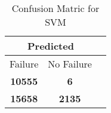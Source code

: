 \begin{table}[] 
\caption{Confusion Matric for SVM} 
\label{Table: Prediction Accuracy-NoneSVM95.0EKF-ignoresolarPanelDipole-solarPanelDipole} 
\centering 
\begin{tabular} 
 {@{}ccc@{}} 
\toprule 
\multicolumn{2}{c}{\textbf{Predicted}}
 \\ \midrule 
\multicolumn{1}{|c|}{Failure} & 
\multicolumn{1}{c|}{No Failure}
 \\ \midrule 
\multicolumn{1}{|c|}{\color{red}\textbf{10555}} & 
\multicolumn{1}{c|}{\color{red}\textbf{6}}
 \\ \midrule 
\multicolumn{1}{|c|}{\color{green}\textbf{15658}} & 
\multicolumn{1}{c|}{\color{green}\textbf{2135}}
 \\ \bottomrule 
\end{tabular} 
\end{table} 
